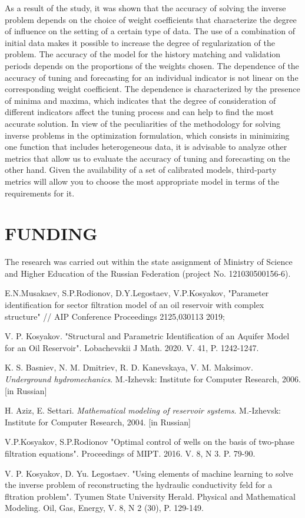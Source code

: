 \documentclass[
11pt,%
tightenlines,%
twoside,%
onecolumn,%
nofloats,%
nobibnotes,%
nofootinbib,%
superscriptaddress,%
noshowpacs,%
centertags]%
{revtex4}
\begin{document}
As a result of the study, it was shown that the accuracy of solving the inverse problem depends on the choice of weight coefficients that characterize the degree of influence on the setting of a certain type of data. The use of a combination of initial data makes it possible to increase the degree of regularization of the problem. The accuracy of the model for the history matching and validation periods depends on the proportions of the weights chosen. The dependence of the accuracy of tuning and forecasting for an individual indicator is not linear on the corresponding weight coefficient. The dependence is characterized by the presence of minima and maxima, which indicates that the degree of consideration of different indicators affect the tuning process and can help to find the most accurate solution. In view of the peculiarities of the methodology for solving inverse problems in the optimization formulation, which consists in minimizing one function that includes heterogeneous data, it is advisable to analyze other metrics that allow us to evaluate the accuracy of tuning and forecasting on the other hand. Given the availability of a set of calibrated models, third-party metrics will allow you to choose the most appropriate model in terms of the requirements for it.


\section{FUNDING}
The research was carried out within the state assignment of Ministry of Science and Higher Education of the Russian Federation (project No. 121030500156-6).

%
%
\begin{thebibliography}{99}
	
 E.N.Musakaev, S.P.Rodionov, D.Y.Legostaev, V.P.Kosyakov, "Parameter identification for sector filtration model of an oil reservoir with complex structure" // AIP Conference Proceedings 2125,030113 2019;

 V. P. Kosyakov. "Structural and Parametric Identification of an Aquifer Model for an Oil Reservoir". Lobachevskii J Math. 2020. V. 41, P. 1242-1247.

 K. S. Basniev, N. M. Dmitriev, R. D. Kanevskaya, V. M. Maksimov. \textit{Underground hydromechanics}. M.-Izhevsk: Institute for Computer Research, 2006. [in Russian]

 H. Aziz, E. Settari. \textit{Mathematical modeling of reservoir systems}.  M.-Izhevsk: Institute for Computer Research, 2004. [in Russian]

 V.P.Kosyakov, S.P.Rodionov "Optimal control of wells on the basis of two-phase filtration equations". Proceedings of MIPT. 2016. V. 8, N 3. P. 79-90.

 V. P. Kosyakov,  D. Yu. Legostaev. "Using elements of machine learning to
solve the inverse problem of reconstructing the hydraulic conductivity feld for a fltration
problem". Tyumen State University Herald. Physical and Mathematical Modeling. Oil, Gas,
Energy, V. 8, N 2 (30), P. 129-149.


\end{thebibliography}
\end{document}
